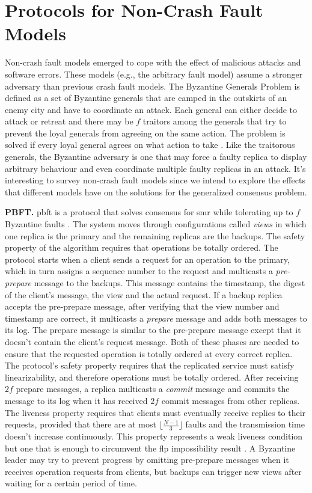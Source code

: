 \section{Protocols for Non-Crash Fault Models} \label{Non-Crash}
Non-crash fault models emerged to cope with the effect of malicious attacks and software errors. These models (e.g., the arbitrary fault model) assume a stronger adversary than previous crash fault models. The Byzantine Generals Problem is defined as a set of Byzantine generals that are camped in the outskirts of an enemy city and have to coordinate an attack. Each general can either decide to attack or retreat and there may be $f$ traitors among the generals that try to prevent the loyal generals from agreeing on the same action. The problem is solved if every loyal general agrees on what action to take \cite{Lamport1982}. Like the traitorous generals, the Byzantine adversary is one that may force a faulty replica to display arbitrary behaviour and even coordinate multiple faulty replicas in an attack. It's interesting to survey non-crash fault models since we intend to explore the effects that different models have on the solutions for the generalized consensus problem. \par
\textbf{PBFT.} \acrfull{pbft} is a protocol that solves consensus for \acrshort{smr} while tolerating up to $f$ Byzantine faults \cite{Castro1999}. The system moves through configurations called \textit{views} in which one replica is the primary and the remaining replicas are the backups. The safety property of the algorithm requires that operations be totally ordered. The protocol starts when a client sends a request for an operation to the primary, which in turn assigns a sequence number to the request and multicasts a \textit{pre-prepare} message to the backups. This message contains the timestamp, the digest of the client's message, the view and the actual request. If a backup replica accepts the pre-prepare message, after verifying that the view number and timestamp are correct, it multicasts a \textit{prepare} message and adds both messages to its log. The prepare message is similar to the pre-prepare message except that it doesn't contain the client's request message. Both of these phases are needed to ensure that the requested operation is totally ordered at every correct replica. The protocol's safety property requires that the replicated service must satisfy linearizability, and therefore operations must be totally ordered. After receiving $2f$ prepare messages, a replica multicasts a \textit{commit} message and commits the message to its log when it has received $2f$ commit messages from other replicas. The liveness property requires that clients must eventually receive replies to their requests, provided that there are at most $\lfloor\frac{N-1}{3}\rfloor$ faults and the transmission time doesn't increase continuously. This property represents a weak liveness condition but one that is enough to circumvent the \acrshort{flp} impossibility result \cite{Fischer1985}. A Byzantine leader may try to prevent progress by omitting pre-prepare messages when it receives operation requests from clients, but backups can trigger new views after waiting for a certain period of time. \par
